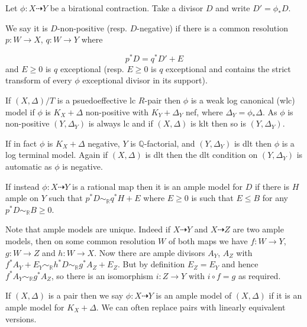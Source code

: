 \documentclass[a4paper,12pt]{book}
\begin{document}
\begin{definition}\label{Model-defs}
	Let $\phi:X \dashrightarrow Y$ be a birational contraction. Take a divisor $D$ and write $D'=\phi_{*}D$. 
	
	We say it is $D$-non-positive (resp. $D$-negative) if there is a common resolution $p:W \to X$, $q:W \to Y$ where 
	
	\[p^{*}D=q^{*}D'+E\]
	and $E \geq 0$ is $q$ exceptional (resp. $E \geq 0$ is $q$ exceptional and contains the strict transform of every $\phi$ exceptional divisor in its support). 
	
	If $(X,\Delta)/T$ is a psuedoeffective lc $R$-pair then $\phi$ is a weak log canonical (wlc) model if $\phi$ is $K_{X}+\Delta$ non-positive with $K_{Y}+\Delta_{Y}$ nef, where $\Delta_{Y}=\phi_{*}\Delta$. As $\phi$ is non-positive $(Y,\Delta_{Y})$ is always lc and if $(X,\Delta)$ is klt then so is $(Y,\Delta_{Y})$. 
	
	If in fact $\phi$ is $K_{X}+\Delta$ negative, $Y$ is $\mathbb{Q}$-factorial, and $(Y,\Delta_{Y})$ is dlt then $\phi$ is a log terminal model. Again if $(X,\Delta)$ is dlt then the dlt condition on $(Y,\Delta_{Y})$ is automatic as $\phi$ is negative.
	
	If instead $\phi:X \dashrightarrow Y$ is a rational map then it is an ample model for $D$ if there is $H$ ample on $Y$ such that $p^{*}D\sim_{\mathbb{R}}q^{*}H+E$ where $E \geq 0$ is such that $E \leq B$ for any $p^{*}D \sim_{\mathbb{R}} B \geq 0$.
\end{definition}


Note that ample models are unique. Indeed if $X \dashrightarrow Y$ and $X \dashrightarrow Z$ are two ample models, then on some common resolution $W$ of both maps we have $f:W \to Y$, $g:W \to Z$ and $h:W \to X$. Now there are ample divisors $A_{Y}$, $A_{Z}$ with $f^{*}A_{Y}+E_{Y}\sim_{\mathbb{R}}h^{*}D \sim_{\mathbb{R}}g^{*}A_{Z}+E_{Z}$. But by definition $E_{Z}=E_{Y}$ and hence $f^{*}A_{Y}\sim_{\mathbb{R}}g^{*}A_{Z}$, so there is an isomorphism $i:Z \to Y$ with $i \circ f= g$ as required.

If $(X,\Delta)$ is a pair then we say $\phi:X \dashrightarrow Y$ is an ample model of $(X,\Delta)$ if it is an ample model for $K_{X}+\Delta$. We can often replace pairs with linearly equivalent versions.
\end{document}
